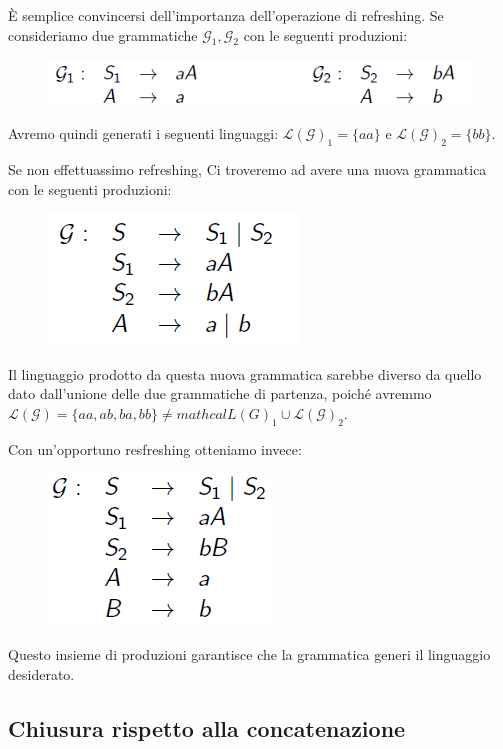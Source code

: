 \documentclass[class=book, crop=false, oneside, 12pt]{standalone}
\begin{document}
\begin{osservazione}
  È semplice convincersi dell'importanza dell'operazione di refreshing. Se consideriamo due grammatiche \(\mathcal{G}_1, \mathcal{G}_2\) con le seguenti produzioni:
  \begin{figure}
    \centering
    \includegraphics[width=.7\textwidth,keepaspectratio]{why-refresh_1}
  \end{figure}
  \noindent Avremo quindi generati i seguenti linguaggi: \(\mathcal{L(G)}_1 = \{aa\}\) e \(\mathcal{L(G)}_2 = \{bb\}\).

  Se non effettuassimo refreshing, Ci troveremo ad avere una nuova grammatica con le seguenti produzioni:
  \begin{figure}
    \centering
    \includegraphics[width=.3\textwidth,keepaspectratio]{why-refresh_2}
  \end{figure}
  \noindent Il linguaggio prodotto da questa nuova grammatica sarebbe diverso da quello dato dall'unione delle due grammatiche di partenza, poiché avremmo \(\mathcal{L(G)} = \{aa, ab, ba, bb\} \neq mathcal{L(G)}_1 \cup \mathcal{L(G)}_2\).

  Con un'opportuno resfreshing otteniamo invece:
  \begin{figure}
    \centering
    \includegraphics[width=.3\textwidth,keepaspectratio]{why-refresh_3}
  \end{figure}
  Questo insieme di produzioni garantisce che la grammatica generi il linguaggio desiderato.
\end{osservazione}

\subsection*{Chiusura rispetto alla concatenazione}
\end{document}
